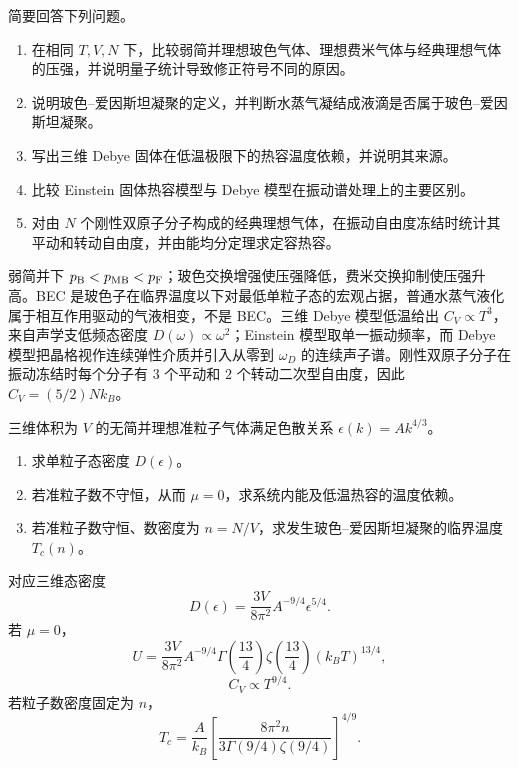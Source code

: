 
\begin{question}
简要回答下列问题。
\begin{enumerate}
\item 在相同 $T,V,N$ 下，比较弱简并理想玻色气体、理想费米气体与经典理想气体的压强，并说明量子统计导致修正符号不同的原因。
\item 说明玻色--爱因斯坦凝聚的定义，并判断水蒸气凝结成液滴是否属于玻色--爱因斯坦凝聚。
\item 写出三维 Debye 固体在低温极限下的热容温度依赖，并说明其来源。
\item 比较 Einstein 固体热容模型与 Debye 模型在振动谱处理上的主要区别。
\item 对由 $N$ 个刚性双原子分子构成的经典理想气体，在振动自由度冻结时统计其平动和转动自由度，并由能均分定理求定容热容。
\end{enumerate}
\begin{solution}
弱简并下 $p_{\rm B}<p_{\rm MB}<p_{\rm F}$；玻色交换增强使压强降低，费米交换抑制使压强升高。BEC 是玻色子在临界温度以下对最低单粒子态的宏观占据，普通水蒸气液化属于相互作用驱动的气液相变，不是 BEC。三维 Debye 模型低温给出 $C_V\propto T^3$，来自声学支低频态密度 $D(\omega)\propto\omega^2$；Einstein 模型取单一振动频率，而 Debye 模型把晶格视作连续弹性介质并引入从零到 $\omega_D$ 的连续声子谱。刚性双原子分子在振动冻结时每个分子有 $3$ 个平动和 $2$ 个转动二次型自由度，因此 $C_V=(5/2)Nk_B$。
\end{solution}
\end{question}

\begin{question}
三维体积为 $V$ 的无简并理想准粒子气体满足色散关系 $\epsilon(k)=A k^{4/3}$。\begin{enumerate}\item 求单粒子态密度 $D(\epsilon)$。\item 若准粒子数不守恒，从而 $\mu=0$，求系统内能及低温热容的温度依赖。\item 若准粒子数守恒、数密度为 $n=N/V$，求发生玻色--爱因斯坦凝聚的临界温度 $T_c(n)$。\end{enumerate}
\begin{solution}
对应三维态密度
\[D(\epsilon)=\frac{3V}{8\pi^2}A^{-9/4}\epsilon^{5/4}.\]
若 $\mu=0$，
\[U=\frac{3V}{8\pi^2}A^{-9/4}\Gamma\!\left(\frac{13}{4}\right)\zeta\!\left(\frac{13}{4}\right)(k_BT)^{13/4},\]
\[C_V\propto T^{9/4}.\]
若粒子数密度固定为 $n$，
\[T_c=\frac{A}{k_B}\left[\frac{8\pi^2n}{3\Gamma(9/4)\zeta(9/4)}\right]^{4/9}.\]
\end{solution}
\end{question}

